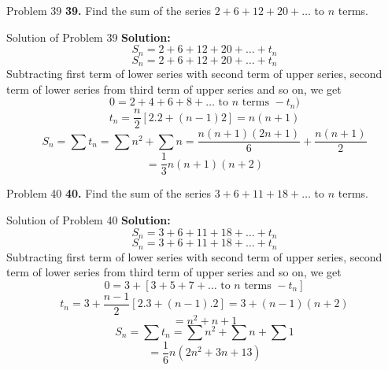 \documentclass[aspectratio=1610,8pt]{beamer}
\begin{document}
\begin{frame}{Problem 39}
  \textbf{39.} Find the sum of the series $2 + 6 + 12 + 20 + \ldots$ to $n$ terms.
\end{frame}
\begin{frame}{Solution of Problem 39}
  \textbf{Solution:} $$S_n = 2 + 6 + 12 + 20 + \ldots + t_n$$
  $$S_n = 2 + 6 + 12 + 20 + \ldots + t_n$$
  Subtracting first term of lower series with second term of upper series, second term of lower series from third term of upper
  series and so on, we get
  $$0 = 2 + 4 + 6 + 8 + \ldots \text{~to~}n\text{~terms~} - t_n)$$
  $$t_n = \frac{n}{2}[2.2 + (n - 1)2] = n(n + 1)$$
  $$S_n = \sum t_n = \sum n^2 + \sum n = \frac{n(n + 1)(2n + 1)}{6} + \frac{n(n + 1)}{2}$$
  $$= \frac{1}{3}n(n + 1)(n + 2)$$
\end{frame}
\begin{frame}{Problem 40}
  \textbf{40.} Find the sum of the series $3 + 6 + 11 + 18 + \ldots$ to $n$ terms.
\end{frame}
\begin{frame}{Solution of Problem 40}
  \textbf{Solution:} $$S_n = 3 + 6 + 11 + 18 + \ldots + t_n$$
  $$S_n = 3 + 6 + 11 + 18 + \ldots + t_n$$
  Subtracting first term of lower series with second term of upper series, second term of lower series from third term of upper
  series and so on, we get
  $$0 = 3 + [3 + 5 + 7 + \ldots \text{~to~}n\text{~terms~} - t_n]$$
  $$t_n = 3 + \frac{n - 1}{2}[2.3 + (n - 1).2] = 3 + (n - 1)(n + 2)$$
  $$= n^2 + n + 1$$
  $$S_n = \sum t_n = \sum n^2 + \sum n + \sum 1$$
  $$= \frac{1}{6}n(2n^2 + 3n + 13)$$
\end{frame}
\end{document}
